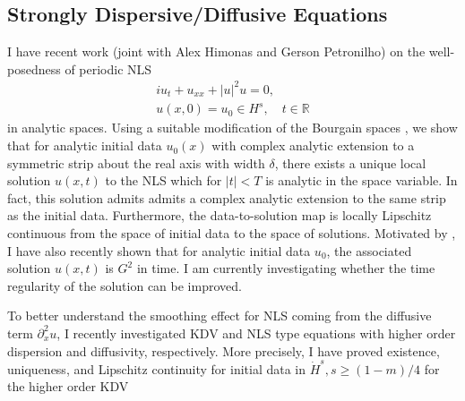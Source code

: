 \documentclass[12pt,reqno]{amsart}
\newcommand{\rr}{\mathbb{R}}
\newcommand{\ci}{\mathbb{T}}
\newcommand{\p}{\partial}
\begin{document}
\subsection{Strongly Dispersive/Diffusive Equations} 
\label{ssec:strong-disp}
I have recent work (joint with Alex Himonas and Gerson Petronilho) on the
well-posedness of periodic NLS 
\begin{gather}
  iu_{t} + u_{xx} + | u |^{2}u = 0,
\\
u(x,0) = u_{0} \in H^{s}, \quad t \in \rr
\end{gather}
in analytic spaces. Using a suitable modification
of the Bourgain spaces \cite{Bourgain-Fourier-transfo}, we show that for
analytic initial data $u_{0}(x)$ with
complex analytic extension to a symmetric strip about the real axis with width
$\delta$, there exists a unique local
solution $u(x,t)$ to the NLS which for $| t | < T$
is analytic in the space variable. In fact, this solution admits admits a
complex analytic extension to the same strip as the initial data. Furthermore,
the data-to-solution map is locally Lipschitz continuous from the space of
initial data to the space of solutions. Motivated by
\cite{Gorsky-The-Cauchy-prob}, I have also recently shown that for analytic
initial data $u_{0}$, the associated solution $u(x,t)$ is $G^{2}$ in time. I am
currently investigating whether the time regularity of the solution can be improved. 

To better understand the smoothing effect for NLS coming from the diffusive term
$\p_{x}^{2}u$, I
recently investigated KDV and NLS type equations with higher order
dispersion and diffusivity, respectively. More precisely, I have proved
existence, uniqueness, and Lipschitz continuity for initial data in
$\dot{H}^{s}, s \ge (1-m)/4$ for the higher order KDV
\end{document}
